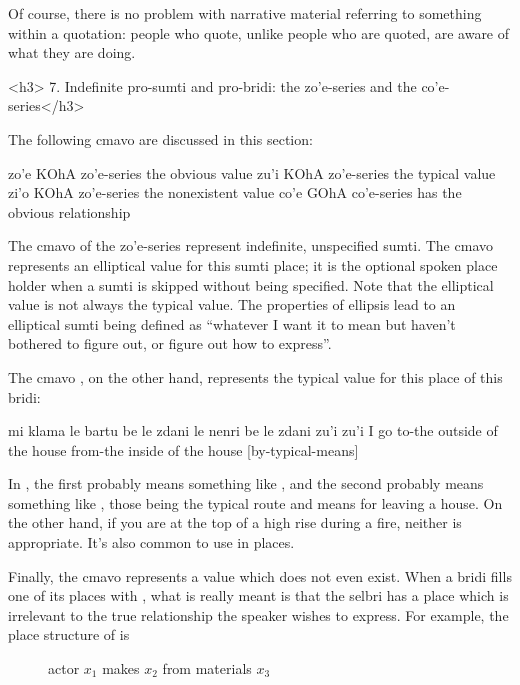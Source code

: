 Of course, there is no problem with narrative material
    referring to something within a quotation: people who quote,
    unlike people who are quoted, are aware of what they are doing.

<h3>
7. Indefinite pro-sumti and pro-bridi: the zo'e-series and
    the co'e-series</h3>

The following cmavo are discussed in this section:

   zo'e    KOhA    zo'e-series the obvious value
    zu'i    KOhA    zo'e-series the typical value
    zi'o    KOhA    zo'e-series the nonexistent value
    co'e    GOhA    co'e-series has the obvious relationship

The cmavo of the zo'e-series represent indefinite, unspecified
    sumti. The cmavo  represents an elliptical value for
    this sumti place; it is the optional spoken place holder when a
    sumti is skipped without being specified. Note that the
    elliptical value is not always the typical value. The
    properties of ellipsis lead to an elliptical sumti being
    defined as ``whatever I want it to mean but haven't bothered to
    figure out, or figure out how to express''. 

The cmavo , on the other hand, represents the
    typical value for this place of this bridi:
\begin{example}
mi klama le bartu be le zdani\n
\T	le nenri be le zdani\n
\T	zu'i zu'i\n
I go to-the outside of the house\n
\T	from-the inside of the house\n
\T	{} [by-typical-means]
\end{example}

In , the first 
    probably means something like , and the second
     probably means something like , those being
    the typical route and means for leaving a house. On the other
    hand, if you are at the top of a high rise during a fire,
    neither  is appropriate. It's also common to use
     in  places.

Finally, the cmavo  represents a value which does
    not even exist. When a bridi fills one of its places with
    , what is really meant is that the selbri has a place
    which is irrelevant to the true relationship the speaker wishes
    to express. For example, the place structure of 
    is
\begin{description}
\item[] actor $x_1$ makes $x_2$ from materials $x_3$
\end{description}

